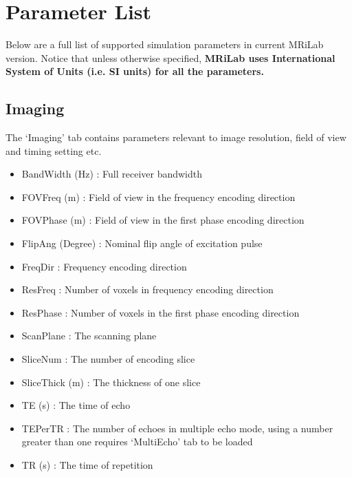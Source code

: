 \documentclass{book}%
\begin{document}
\section{Parameter List} \label{chap:ParameterList}

Below are a full list of supported simulation parameters in current MRiLab version. Notice that unless otherwise specified, \textbf{MRiLab uses International System of Units (i.e. SI units) for all the parameters.}

\subsection{Imaging}
The `Imaging' tab contains parameters relevant to image resolution, field of view and timing setting etc.
	\begin{itemize}
		\item BandWidth (Hz) : Full receiver bandwidth
		\item FOVFreq (m) : Field of view in the frequency encoding direction
		\item FOVPhase (m) : Field of view in the first phase encoding direction
	  \item FlipAng (Degree) : Nominal flip angle of excitation pulse
		\item FreqDir : Frequency encoding direction
		\item ResFreq : Number of voxels in frequency encoding direction
		\item ResPhase : Number of voxels in the first phase encoding direction
		\item ScanPlane : The scanning plane
		\item SliceNum : The number of encoding slice
		\item SliceThick (m) : The thickness of one slice
		\item TE (s) : The time of echo
		\item TEPerTR : The number of echoes in multiple echo mode, using a number greater than one requires `MultiEcho' tab to be loaded
		\item TR (s) : The time of repetition
	\end{itemize}
\end{document}
